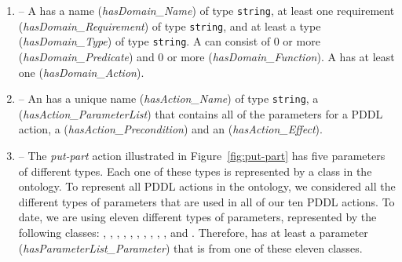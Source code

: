 %
%
\begin{enumerate}
\item {} -- A  has a name (\emph{hasDomain\_Name}) of type
\texttt{string}, at least one requirement (\emph{hasDomain\_Requirement}) of type
\texttt{string}, and at least a type (\emph{hasDomain\_Type}) of type \texttt{string}.
A  can consist of 0 or more  (\emph{hasDomain\_Predicate})
and 0 or more  (\emph{hasDomain\_Function}). A  has
at least one  (\emph{hasDomain\_Action}).
\item {} -- An  has a unique name (\emph{hasAction\_Name}) of
type \texttt{string}, a  (\emph{hasAction\_ParameterList}) that contains all of the 
parameters for a PDDL action,
a  (\emph{hasAction\_Precondition}) and
an  (\emph{hasAction\_Effect}). 
\item {} -- The \textsl{put-part} action illustrated in
Figure~\ref{fig:put-part} has five parameters of different types. Each one of
these types is represented by a class in the  ontology. To represent
all PDDL actions in the  ontology, we considered all the different types
of parameters that are used in all of our ten PDDL actions. To date, we are using eleven
different types of parameters, represented by the following classes:
, , , ,
, , ,
, , , and .
Therefore,  has at least a parameter
(\emph{hasParameterList\_Parameter}) that is from one of these eleven classes.


\end{enumerate}
